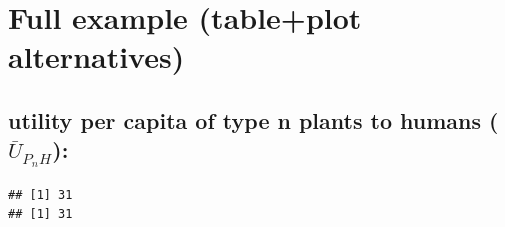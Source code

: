 \documentclass[
]{book}
\begin{document}
\hypertarget{full-example-tableplot-alternatives}{%
\section{Full example (table+plot alternatives)}\label{full-example-tableplot-alternatives}}

\hypertarget{utility-per-capita-of-type-n-plants-to-humans-baru_p_nh}{%
\subsection{\texorpdfstring{utility per capita \textbf{of} type n plants \textbf{to} humans (\(\bar{U}_{P_{n}H}\)):}{utility per capita of type n plants to humans (\textbackslash bar\{U\}\_\{P\_\{n\}H\}):}}\label{utility-per-capita-of-type-n-plants-to-humans-baru_p_nh}}

\begin{verbatim}
## [1] 31
## [1] 31
\end{verbatim}
\end{document}
